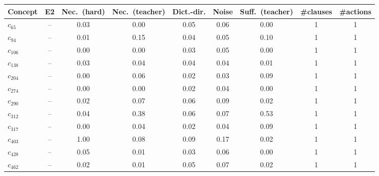 \begin{tabular}{lcccccccc}
\toprule
Concept & E2 & Nec.\ (hard) & Nec.\ (teacher) & Dict.-dir. & Noise & Suff.\ (teacher) & \#clauses & \#actions \\
\midrule
$c_{65}$ & -- & 0.03 & 0.00 & 0.05 & 0.06 & 0.00 & 1 & 1 \\
$c_{94}$ & -- & 0.01 & 0.15 & 0.04 & 0.05 & 0.10 & 1 & 1 \\
$c_{106}$ & -- & 0.00 & 0.00 & 0.03 & 0.05 & 0.00 & 1 & 1 \\
$c_{138}$ & -- & 0.03 & 0.04 & 0.04 & 0.04 & 0.01 & 1 & 1 \\
$c_{204}$ & -- & 0.00 & 0.06 & 0.02 & 0.03 & 0.09 & 1 & 1 \\
$c_{274}$ & -- & 0.00 & 0.00 & 0.02 & 0.04 & 0.00 & 1 & 1 \\
$c_{290}$ & -- & 0.02 & 0.07 & 0.06 & 0.09 & 0.02 & 1 & 1 \\
$c_{312}$ & -- & 0.04 & 0.38 & 0.06 & 0.07 & 0.53 & 1 & 1 \\
$c_{317}$ & -- & 0.00 & 0.04 & 0.02 & 0.04 & 0.09 & 1 & 1 \\
$c_{403}$ & -- & 1.00 & 0.08 & 0.09 & 0.17 & 0.02 & 1 & 1 \\
$c_{428}$ & -- & 0.05 & 0.01 & 0.03 & 0.06 & 0.00 & 1 & 1 \\
$c_{462}$ & -- & 0.02 & 0.01 & 0.05 & 0.07 & 0.02 & 1 & 1 \\
\bottomrule
\end{tabular}